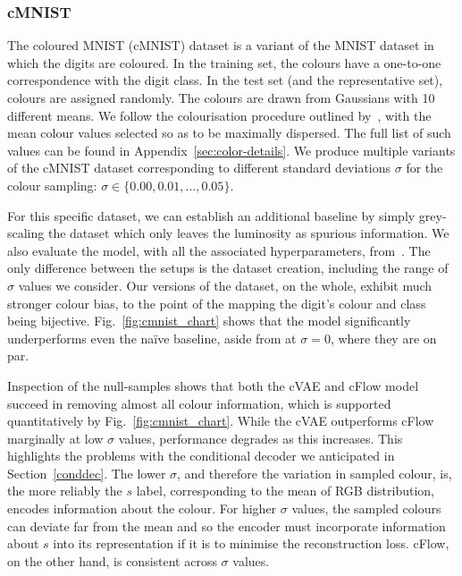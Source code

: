 \subsubsection{cMNIST}\label{ssec:cmnist}
The coloured MNIST (cMNIST) dataset is a variant of the MNIST dataset in which the digits are coloured.
In the training set, the colours have a one-to-one correspondence with the digit class.
In the test set (and the representative set), colours are assigned randomly.
The colours are drawn from Gaussians with 10 different means.
We follow the colourisation procedure outlined by~\cite{ln2l}, with the mean colour values selected so as to be maximally dispersed.
The full list of such values can be found in Appendix~\ref{sec:color-details}.
We produce multiple variants of the cMNIST dataset corresponding to different standard deviations $\sigma$ for the colour sampling:
$\sigma \in \{0.00, 0.01, ..., 0.05 \}$.

For this specific dataset, we can establish an additional baseline by simply grey-scaling the dataset
which only leaves the luminosity as spurious information.
We also evaluate the model, with all the associated hyperparameters, from~\cite{ln2l}.
The only difference between the setups is the dataset creation, including the range of $\sigma$ values we consider.
Our versions of the dataset, on the whole, exhibit much stronger colour bias, to the point of the mapping the digit's colour and class being bijective.
Fig.~\ref{fig:cmnist_chart} shows that the model significantly underperforms even the na\"ive baseline, aside from at $\sigma = 0$, where they are on par.

Inspection of the null-samples shows that both the cVAE and cFlow model succeed in removing almost all colour information, which is supported quantitatively by Fig.~\ref{fig:cmnist_chart}.
While the cVAE outperforms cFlow marginally at low $\sigma$ values, performance degrades
as this increases.
This highlights the problems with the conditional decoder we anticipated in Section~\ref{conddec}.
The lower $\sigma$, and therefore the variation in sampled colour, is, the more reliably the $s$ label, corresponding to the mean of RGB distribution, encodes information about the colour.
For higher $\sigma$ values, the sampled colours can deviate far from the mean and so the encoder must incorporate information about $s$ into its representation if it is to minimise the reconstruction loss.
cFlow, on the other hand, is consistent across $\sigma$ values.


